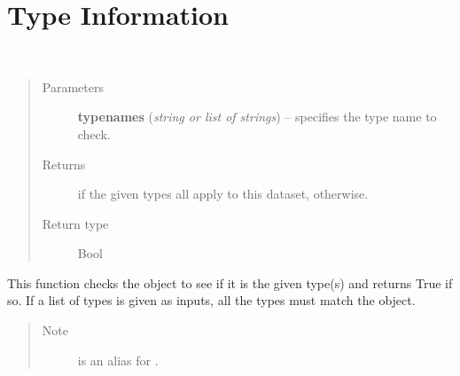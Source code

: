 \documentclass[letterpaper,10pt,english]{sphinxmanual}
\begin{document}
\section{Type Information}
\label{chapter_AstroDataClass:type-information}

\begin{fulllineitems}
\label{chapter_AstroDataClass:astrodata.data.AstroData.is_type}~\begin{quote}\begin{description}
\item[{Parameters}] \leavevmode
\textbf{typenames} (\emph{string or list of strings}) -- specifies the type name to check.

\item[{Returns}] \leavevmode
{} if the given types all apply to this dataset,
 otherwise.

\item[{Return type}] \leavevmode
Bool

\end{description}\end{quote}

This function checks the  object to see if it is the
given type(s) and returns True if so.  If a list of types is given
as inputs, all the types must match the  object.
\begin{quote}\begin{description}
\item[{Note }] \leavevmode
{} is an alias for 
.

\end{description}\end{quote}

\end{fulllineitems}

\end{document}
